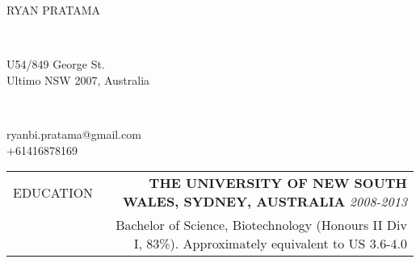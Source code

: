 \documentclass[a4paper,10pt]{article}
\newcommand\VRule{\color{lightgray}\vrule}
\newcommand\HRule{}
\begin{document}

\noindent\makebox[\linewidth]{\rule{\paperwidth}{0.15in}}
\vspace{0.10in}

%

\begin{minipage}[c]{0.4\textwidth}
\Huge \cabincondensed \uppercase{Ryan Pratama}
\end{minipage}
\begin{minipage}[c]{0.025\textwidth}
\\
\end{minipage}
\begin{minipage}[c]{0.275\textwidth}
 U54/849 George St.\\
Ultimo NSW 2007, Australia
\end{minipage}
\begin{minipage}[c]{0.03\textwidth}
\\
\phone
\end{minipage}
\begin{minipage}[c]{0.27\textwidth}
 ryanbi.pratama@gmail.com\\
 +61416878169
\end{minipage}


\vspace{0.25in}


\begin{tabular}{L!{\VRule}R}
\uppercase{Education} \HRule & \textbf{\uppercase{The University of New South Wales, Sydney, Australia}} \hfill\small \textit{2008-2013}\\
 & {Bachelor of Science, Biotechnology (Honours II Div I, 83\%). \footnotesize{Approximately equivalent to US 3.6-4.0 \footnotemark[1]}}
\\
\end{tabular}
\end{document}
